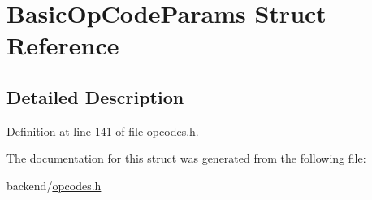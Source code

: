 \hypertarget{struct_basic_op_code_params}{}\section{Basic\+Op\+Code\+Params Struct Reference}
\label{struct_basic_op_code_params}


\subsection{Detailed Description}


Definition at line 141 of file opcodes.\+h.



The documentation for this struct was generated from the following file\+:\begin{DoxyCompactItemize}
\item 
backend/\mbox{\hyperlink{opcodes_8h}{opcodes.\+h}}\end{DoxyCompactItemize}
